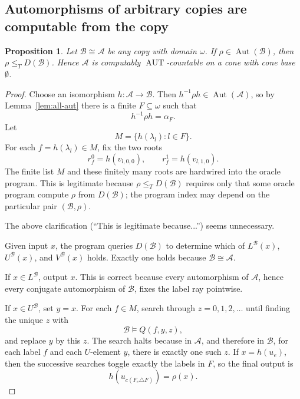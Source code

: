 \documentclass[12pt]{article}
\newtheorem{proposition}[theorem]{Proposition}
\theoremstyle{definition}
\theoremstyle{remark}
\newcommand{\Aut}{\operatorname{Aut}}
\newcommand{\review}[1]{\begin{reviewbox}#1\end{reviewbox}}
\begin{document}
\subsection{Automorphisms of arbitrary copies are computable from the copy}\label{sec:copies}

\begin{proposition}\label{prop:copies}
Let \(\mathcal B\cong\mathcal A\) be any copy with domain \(\omega\).  If \(\rho\in\Aut(\mathcal B)\), then \(\rho\leq_T D(\mathcal B)\).  Hence \(\mathcal A\) is computably \(\operatorname{AUT}\)-countable on a cone with cone base \(\emptyset\).
\end{proposition}

\begin{proof}
Choose an isomorphism \(h:\mathcal A\to\mathcal B\).  Then \(h^{-1}\rho h\in\Aut(\mathcal A)\), so by Lemma~\ref{lem:all-aut} there is a finite \(F\subseteq\omega\) such that
\[
h^{-1}\rho h=\alpha_F.
\]
Let
\[
M=\{h(\lambda_l):l\in F\}.
\]
For each \(f=h(\lambda_l)\in M\), fix the two roots
\[
r_f^0=h(v_{l,0,0}),\qquad r_f^1=h(v_{l,1,0}).
\]
The finite list \(M\) and these finitely many roots are hardwired into the oracle program.  This is legitimate because \(\rho\leq_TD(\mathcal B)\) requires only that some oracle program compute \(\rho\) from \(D(\mathcal B)\); the program index may depend on the particular pair \((\mathcal B,\rho)\).

\review{The above clarification (``This is legitimate because...'') seems unnecessary.}

Given input \(x\), the program queries \(D(\mathcal B)\) to determine which of \(L^{\mathcal B}(x)\), \(U^{\mathcal B}(x)\), and \(V^{\mathcal B}(x)\) holds.  Exactly one holds because \(\mathcal B\cong\mathcal A\).

If \(x\in L^{\mathcal B}\), output \(x\).  This is correct because every automorphism of \(\mathcal A\), hence every conjugate automorphism of \(\mathcal B\), fixes the label ray pointwise.

If \(x\in U^{\mathcal B}\), set \(y=x\).  For each \(f\in M\), search through \(z=0,1,2,\ldots\) until finding the unique \(z\) with
\[
\mathcal B\models Q(f,y,z),
\]
and replace \(y\) by this \(z\).  The search halts because in \(\mathcal A\), and therefore in \(\mathcal B\), for each label \(f\) and each \(U\)-element \(y\), there is exactly one such \(z\).  If \(x=h(u_e)\), then the successive searches toggle exactly the labels in \(F\), so the final output is
\[
h(u_{c(F_e\triangle F)})=\rho(x).
\]


\end{proof}
\end{document}

